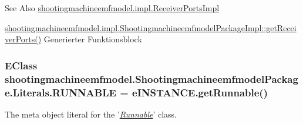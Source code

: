 \begin{DoxySeeAlso}{See Also}
\hyperlink{classshootingmachineemfmodel_1_1impl_1_1_receiver_ports_impl}{shootingmachineemfmodel.\-impl.\-Receiver\-Ports\-Impl} 

\hyperlink{classshootingmachineemfmodel_1_1impl_1_1_shootingmachineemfmodel_package_impl_a821826b4a77ddfe1d4366780aeef3b9c}{shootingmachineemfmodel.\-impl.\-Shootingmachineemfmodel\-Package\-Impl\-::get\-Receiver\-Ports()} Generierter Funktionsblock 
\end{DoxySeeAlso}
\hypertarget{interfaceshootingmachineemfmodel_1_1_shootingmachineemfmodel_package_1_1_literals_adc1820eccabf58b14ef224032dd51498}{
\subsubsection[{R\-U\-N\-N\-A\-B\-L\-E}]{\setlength{\rightskip}{0pt plus 5cm}E\-Class shootingmachineemfmodel.\-Shootingmachineemfmodel\-Package.\-Literals.\-R\-U\-N\-N\-A\-B\-L\-E = e\-I\-N\-S\-T\-A\-N\-C\-E.\-get\-Runnable()}}\label{interfaceshootingmachineemfmodel_1_1_shootingmachineemfmodel_package_1_1_literals_adc1820eccabf58b14ef224032dd51498}
The meta object literal for the '\hyperlink{classshootingmachineemfmodel_1_1impl_1_1_runnable_impl}{{\itshape Runnable}}' class.

